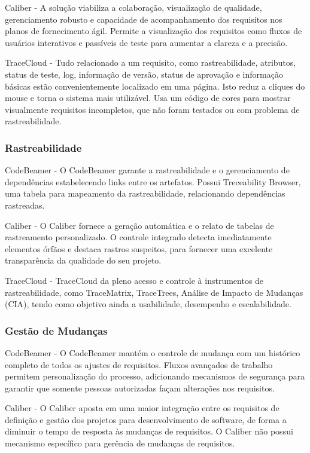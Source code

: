 Caliber - A solução viabiliza a colaboração, visualização de qualidade, gerenciamento robusto e capacidade de acompanhamento dos requisitos nos planos de fornecimento ágil. Permite a visualização dos requisitos como fluxos de usuários interativos e passíveis de teste para aumentar a clareza e a precisão.

TraceCloud - Tudo relacionado a um requisito, como rastreabilidade, atributos, status de teste, log, informação de versão, status de aprovação e informação básicas estão convenientemente localizado em uma página. Isto reduz a cliques do mouse e torna o sistema mais utilizável. Usa um código de cores para mostrar visualmente requisitos incompletos, que não foram testados ou com problema de rastreabilidade.

\subsubsection{Rastreabilidade}

CodeBeamer - O CodeBeamer garante a rastreabilidade e o gerenciamento de dependências estabelecendo links entre os artefatos. Possui Treceability Browser, uma tabela para mapeamento da rastreabilidade, relacionando dependências rastreadas.

Caliber - O Caliber fornece a geração automática e o relato de tabelas de rastreamento personalizado. O controle integrado detecta imediatamente elementos órfãos e destaca rastros suspeitos, para fornecer uma excelente transparência da qualidade do seu projeto.

TraceCloud - TraceCloud da pleno acesso e controle à instrumentos de rastreabilidade, como TraceMatrix, TraceTrees, Análise de Impacto de Mudanças (CIA), tendo como objetivo ainda a usabilidade, desempenho e escalabilidade.

\subsubsection{Gestão de Mudanças}

CodeBeamer - O CodeBeamer mantém o controle de mudança com um histórico completo de todos os ajustes de requisitos. Fluxos avançados de trabalho permitem personalização do processo, adicionando mecanismos de segurança para garantir que somente pessoas autorizadas façam alterações nos requisitos.

Caliber - O Caliber aposta em uma maior integração entre os requisitos de definição e gestão dos projetos para desenvolvimento de software, de forma a diminuir o tempo de resposta às mudanças de requisitos. O Caliber não possui mecanismo específico para gerência de mudanças de requisitos.

